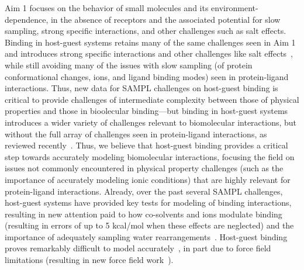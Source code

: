 \documentclass[11pt]{article}
\begin{document}
Aim 1 focuses on the behavior of small molecules and its environment-dependence, in the absence of receptors and the associated potential for slow sampling, strong specific interactions, and other challenges such as salt effects.
Binding in host-guest systems retains many of the same challenges seen in Aim 1 and introduces strong specific interactions and other challenges like salt effects~\cite{mobley_predicting_2016}, while still avoiding many of the issues with slow sampling (of protein conformational changes, ions, and ligand binding modes) seen in protein-ligand interactions.
Thus, new data for SAMPL challenges on host-guest binding is critical to provide challenges of intermediate complexity between those of physical properties and those in bioolecular binding---but binding in host-guest systems introduces a wider variety of challenges relevant to biomolecular interactions, but without the full array of challenges seen in protein-ligand interactions, as reviewed recently~\cite{mobley_predicting_2016}.
Thus, we believe that host-guest binding provides a critical step towards accurately modeling biomolecular interactions, focusing the field on issues not commonly encountered in physical property challenges (such as the importance of accurately modeling ionic conditions) that are highly relevant for protein-ligand interactions.
Already, over the past several SAMPL challenges, host-guest systems have provided key tests for modeling of binding interactions, resulting in new attention paid to how co-solvents and ions modulate binding (resulting in errors of up to 5 kcal/mol when these effects are neglected) and the importance of adequately sampling water rearrangements~\cite{muddana_sampl4_2014, mobley_predicting_2016, yin_overview_2016, bhakat_resolving_2016}. 
Host-guest binding proves remarkably difficult to model accurately~\cite{henriksen_computational_2015}, in part due to force field limitations (resulting in new force field work~\cite{yin_toward_2015}).
\end{document}

